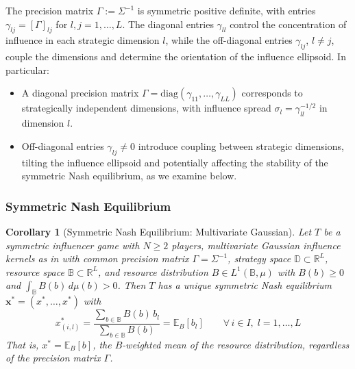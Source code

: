 \documentclass{article}
\newtheorem{corollary}{Corollary}[theorem]
\begin{document}
            The precision matrix $\Gamma := \Sigma^{-1}$ is symmetric positive definite, with entries $\gamma_{lj} = [\Gamma]_{lj}$ for $l,j = 1,\ldots,L$. The diagonal entries $\gamma_{ll}$ control the concentration of influence in each strategic dimension $l$, while the off-diagonal entries $\gamma_{lj}$, $l \neq j$, couple the dimensions and determine the orientation of the influence ellipsoid. In particular:
            \begin{itemize}
                \item A diagonal precision matrix $\Gamma = \mathrm{diag}(\gamma_{11},\ldots,\gamma_{LL})$ corresponds to strategically independent dimensions, with influence spread $\sigma_l = \gamma_{ll}^{-1/2}$ in dimension $l$.
                \item Off-diagonal entries $\gamma_{lj} \neq 0$ introduce coupling between strategic dimensions, tilting the influence ellipsoid and potentially affecting the stability of the symmetric Nash equilibrium, as we examine below.
            \end{itemize}

        \subsubsection{Symmetric Nash Equilibrium}\label{subsec:SI_mvg_nash}
        
            \begin{corollary}[Symmetric Nash Equilibrium: Multivariate Gaussian]\label{cor:SI_mvg_nash}
                Let $T$ be a symmetric influencer game with $N \geq 2$ players, multivariate 
                Gaussian influence kernels as in  with common precision matrix $\Gamma = \Sigma^{-1}$, strategy space $\mathbb{D} \subset \mathbb{R}^L$, resource space $\mathbb{B} \subset \mathbb{R}^L$, and resource distribution $B \in L^1(\mathbb{B},\mu)$ with $B(b) \geq 0$ and $\int_\mathbb{B} B(b)\,d\mu(b) > 0$. Then $T$ has a unique symmetric Nash equilibrium $\mathbf{x}^* = (x^*,\ldots,x^*)$ with
                \begin{equation}\label{eq:SI_mvg_nash}
                    x_{(i,l)}^* = \frac{\sum_{b\in\mathbb{B}} B(b)\,b_l}{\sum_{b\in\mathbb{B}} B(b)} = \mathbb{E}_B[b_l] \qquad \forall\, i \in I,\; l = 1,\ldots,L
                \end{equation}
                That is, $x^* = \mathbb{E}_B[b]$, the $B$-weighted mean of the resource distribution, regardless of the precision matrix $\Gamma$.
            \end{corollary}
\end{document}

